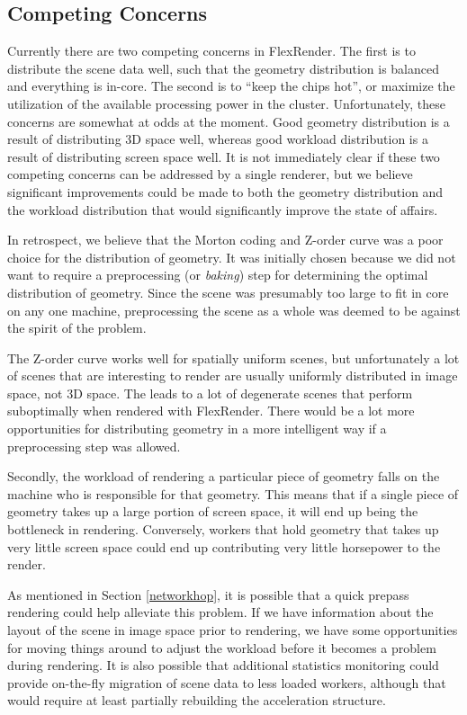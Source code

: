\documentclass[12pt]{ucthesis}
\begin{document}
\subsection{Competing Concerns}
\label{concerns}

Currently there are two competing concerns in FlexRender. The first is to
distribute the scene data well, such that the geometry distribution is balanced
and everything is in-core. The second is to ``keep the chips hot'', or maximize
the utilization of the available processing power in the cluster. Unfortunately,
these concerns are somewhat at odds at the moment. Good geometry distribution
is a result of distributing 3D space well, whereas good workload distribution
is a result of distributing screen space well. It is not immediately clear if
these two competing concerns can be addressed by a single renderer, but we
believe significant improvements could be made to both the geometry distribution
and the workload distribution that would significantly improve the state of affairs.

In retrospect, we believe that the Morton coding and Z-order curve was
a poor choice for the distribution of geometry. It was initially chosen because
we did not want to require a preprocessing (or \emph{baking}) step for
determining the optimal distribution of geometry. Since the scene was presumably
too large to fit in core on any one machine, preprocessing the scene as a whole
was deemed to be against the spirit of the problem.

The Z-order curve works well for spatially uniform scenes, but unfortunately a
lot of scenes that are interesting to render are usually uniformly distributed
in image space, not 3D space. The leads to a lot of degenerate scenes that
perform suboptimally when rendered with FlexRender. There would be a lot more
opportunities for distributing geometry in a more intelligent way if a
preprocessing step was allowed.

Secondly, the workload of rendering a particular piece of geometry falls on
the machine who is responsible for that geometry. This means that if a single
piece of geometry takes up a large portion of screen space, it will end up
being the bottleneck in rendering. Conversely, workers that hold geometry that
takes up very little screen space could end up contributing very little
horsepower to the render.

As mentioned in Section \ref{networkhop}, it is possible that a quick prepass
rendering could help alleviate this problem. If we have information about the
layout of the scene in image space prior to rendering, we have some opportunities
for moving things around to adjust the workload before it becomes a problem during
rendering. It is also possible that additional statistics monitoring could provide
on-the-fly migration of scene data to less loaded workers, although that would
require at least partially rebuilding the acceleration structure.
\end{document}
